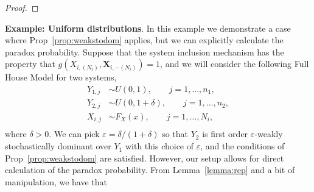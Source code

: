 \documentclass[12pt]{article}
\begin{document}
\begin{proof}
\end{proof}



\noindent\textbf{Example: Uniform distributions}. In this example we demonstrate a case where Prop~\ref{prop:weakstodom} applies, but we can explicitly calculate the paradox probability. Suppose that the system inclusion mechanism has the property that $g(X_{i,(N_i)}, \textbf{X}_{i,-(N_i)}) = 1$, and we will consider the following Full House Model for two systems,
\begin{align*}
  Y_{1,j} &\sim U(0,1), \qquad j = 1,\ldots,n_1, \\
  Y_{2,j} &\sim U(0,1+\delta), \qquad j = 1,\ldots,n_2, \\
  X_{i,j} &\sim F_X(x), \qquad j = 1,\ldots,N_i, \\
\end{align*} 
where $\delta > 0$. We can pick $\varepsilon = \delta/(1 + \delta)$ so that $Y_2$ is first order $\varepsilon$-weakly stochastically dominant over $Y_1$ with this choice of $\varepsilon$, and the conditions of Prop~\ref{prop:weakstodom} are satisfied. However, our setup allows for direct calculation of the paradox probability. From Lemma~\ref{lemma:rep} and a bit of manipulation, we have that 
\end{document}
